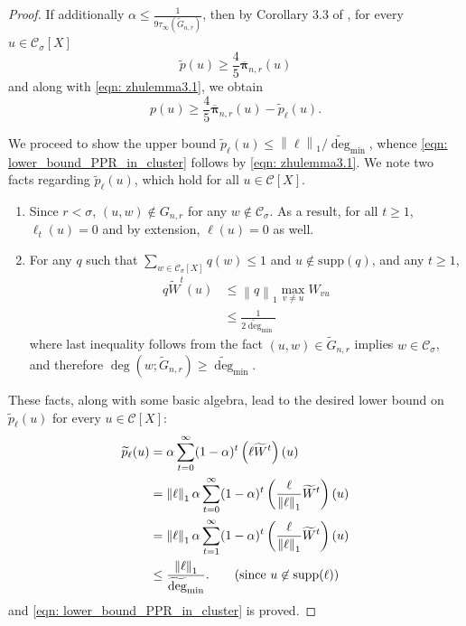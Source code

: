 \documentclass{article}
\newcommand{\norm}[1]{\left\lVert#1\right\rVert}
\newcommand{\1}{\mathbf{1}}
\newcommand{\pbf}{p}        %
\newcommand{\pibf}{\bm{\pi}}
\newcommand{\Xbf}{X}             %
\newcommand{\Wbf}{W}
\newcommand{\Cset}{\mathcal{C}}
\newcommand{\Csig}{\Cset_{\sigma}}
\newcommand{\degminwt}{\widetilde{\deg}_{\min}}
\theoremstyle{aldenthm}
\theoremstyle{aldenrmrk}
\begin{document}
\begin{proof}
	If additionally $\alpha \leq \frac{1}{9\tau_{\infty}(\widetilde{G}_{n,r})}$, then by Corollary 3.3 of \citep{zhu2013}, for every $u \in \Csig[\Xbf]$
	\begin{equation*}
	\widetilde{\pbf}(u) \geq \frac{4}{5} \overline{\pibf}_{n,r}(u)
	\end{equation*}
	and along with \eqref{eqn: zhulemma3.1}, we obtain
	\begin{equation*}
	\pbf(u) \geq \frac{4}{5} \overline{\pibf}_{n,r}(u) - \widetilde{\pbf}_{\ell}(u).
	\end{equation*}
	
	We proceed to show the upper bound $\widetilde{\pbf}_{\ell}(u) \leq \norm{\ell}_1 / \degminwt$, whence \eqref{eqn: lower_bound_PPR_in_cluster} follows by \eqref{eqn: zhulemma3.1}. We note two facts regarding $\widetilde{\pbf}_{\ell}(u)$, which hold for all $u \in \Cset[\Xbf]$. 
	\begin{enumerate}
		\item Since $r < \sigma$, $(u,w) \not\in G_{n,r}$ for any $w \not\in \Csig$. As a result, for all $t \geq 1$, $\ell_t(u) = 0$ and by extension, $\ell(u) = 0$ as well.
		\item For any $q$ such that $\sum_{w \in \Csig[\Xbf]} q(w) \leq 1$ and $u \not\in \mathrm{supp}(q)$, and any $t \geq 1$,
		\begin{align}
		\label{eqn: one_step_bound}
		q \widetilde{\Wbf}^t (u) & \leq \norm{q}_1 \max_{v \neq u} W_{vu} \nonumber \\
		& \leq \frac{1}{2\degminwt} 
		\end{align}
		where last inequality follows from the fact $(u,w) \in \widetilde{G}_{n,r}$ implies $w \in \Csig$, and therefore $\deg(w; \widetilde{G}_{n,r}) \geq \degminwt$.
	\end{enumerate}
	
	These facts, along with some basic algebra, lead to the desired lower bound on $\widetilde{\pbf}_{\ell}(u)$ for every $u \in \Cset[\Xbf]$:
	\begin{align*}
	\widetilde{\pbf}_{\ell}(u) & = \alpha \sum_{t = 0}^{\infty} (1 - \alpha)^t \left(\ell \widetilde{\Wbf}^t \right)(u)  \nonumber \\
	& = \norm{\ell}_1 \alpha \sum_{t = 0}^{\infty} (1 - \alpha)^t \left(\frac{\ell}{\norm{\ell}_1}  \widetilde{\Wbf}^t \right)(u)\nonumber \\
	& = \norm{\ell}_1 \alpha \sum_{t = 1}^{\infty} (1 - \alpha)^t \left(\frac{\ell}{\norm{\ell}_1}  \widetilde{\Wbf}^t \right)(u)\nonumber \\
	& \leq \frac{\norm{\ell}_1 }{\degminwt}. \tag{since $u \not\in \mathrm{supp}(\ell)$}
	\end{align*}
	and \eqref{eqn: lower_bound_PPR_in_cluster} is proved.
	

\end{proof}
\end{document}
